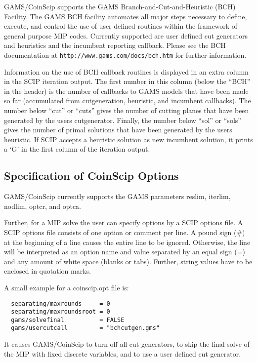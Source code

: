 GAMS/CoinScip supports the GAMS Branch-and-Cut-and-Heuristic (BCH) Facility.
The GAMS BCH facility automates all major steps necessary to define, execute, and control the use of user defined routines within the framework of general purpose MIP codes.
Currently supported are user defined cut generators and heuristics and the incumbent reporting callback.
Please see the BCH documentation at \texttt{http://www.gams.com/docs/bch.htm} for further information.

Information on the use of BCH callback routines is displayed in an extra column in the SCIP iteration output.
The first number in this column (below the ``BCH'' in the header) is the number of callbacks to GAMS models that have been made so far (accumulated from cutgeneration, heuristic, and incumbent callbacks).
The number below ``cut'' or ``cuts'' gives the number of cutting planes that have been generated by the users cutgenerator.
Finally, the number below ``sol'' or ``sols'' gives the number of primal solutions that have been generated by the users heuristic.
If SCIP accepts a heuristic solution as new incumbent solution, it prints a `G' in the first column of the iteration output.

\subsection{Specification of CoinScip Options}

GAMS/CoinScip currently supports the GAMS parameters reslim, iterlim, nodlim, optcr, and optca.

Further, for a MIP solve the user can specify options by a SCIP options file.
A SCIP options file consists of one option or comment per line.
A pound sign (\#) at the beginning of a line causes the entire line to be ignored.
Otherwise, the line will be interpreted as an option name and value separated by an equal sign (=) and any amount of white space (blanks or tabs).
Further, string values have to be enclosed in quotation marks.

A small example for a coinscip.opt file is:
\begin{verbatim}
  separating/maxrounds     = 0
  separating/maxroundsroot = 0
  gams/solvefinal          = FALSE
  gams/usercutcall         = "bchcutgen.gms"
\end{verbatim}
It causes GAMS/CoinScip to turn off all cut generators, to skip the final solve of the MIP with fixed discrete variables, and to use a user defined cut generator.

